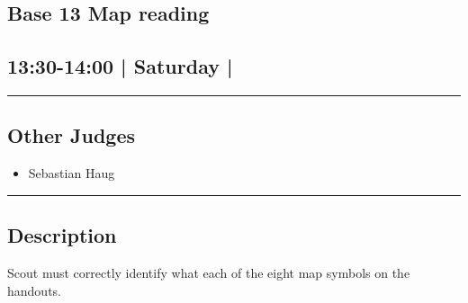 \documentclass[10pt, A5]{article}
\begin{document}
	

		\begin{framed}
			\begin{minipage}{\textwidth}

			\setcounter{section}{40}
							\section{\faStar \: Base 13 \faStar \: Map reading}
						
			\subsection*{13:30-14:00 | Saturday | }

			\vspace{0.25cm}
			\hrule
			\vspace{0.25cm}


			\subsection*{Other Judges}
							

				\begin{multicols}{2}

			\begin{itemize}
											\item Sebastian Haug
								\end{itemize}

			\vfill\null
			\columnbreak

			\begin{itemize}
								\end{itemize}

			\vfill\null

			\end{multicols}

			\vspace{0.25cm}
			\hrule
			\vspace{0.25cm}

			\begin{minipage}{\textwidth}
			\subsection*{\faListAlt \: Description}
			Scout must correctly identify what each of the eight map symbols on the handouts.
			\end{minipage}


	\end{minipage}
	\end{framed}
\end{document}
